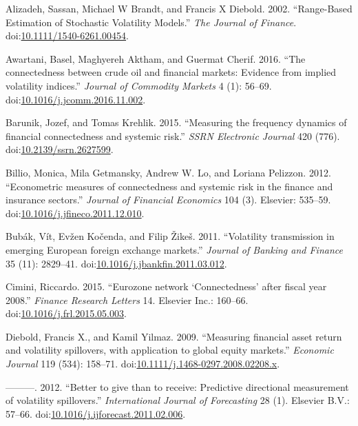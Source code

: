 \documentclass[]{elsarticle} %
\begin{document}
\hypertarget{refs}{}
\hypertarget{ref-Alizadeh2002}{}
Alizadeh, Sassan, Michael W Brandt, and Francis X Diebold. 2002.
``Range-Based Estimation of Stochastic Volatility Models.'' \emph{The
Journal of Finance}.
doi:\href{https://doi.org/10.1111/1540-6261.00454}{10.1111/1540-6261.00454}.

\hypertarget{ref-Awartani2016}{}
Awartani, Basel, Maghyereh Aktham, and Guermat Cherif. 2016. ``The
connectedness between crude oil and financial markets: Evidence from
implied volatility indices.'' \emph{Journal of Commodity Markets} 4 (1):
56--69.
doi:\href{https://doi.org/10.1016/j.jcomm.2016.11.002}{10.1016/j.jcomm.2016.11.002}.

\hypertarget{ref-Barunik2015}{}
Barunik, Jozef, and Tomas Krehlik. 2015. ``Measuring the frequency
dynamics of financial connectedness and systemic risk.'' \emph{SSRN
Electronic Journal} 420 (776).
doi:\href{https://doi.org/10.2139/ssrn.2627599}{10.2139/ssrn.2627599}.

\hypertarget{ref-Billio2012}{}
Billio, Monica, Mila Getmansky, Andrew W. Lo, and Loriana Pelizzon.
2012. ``Econometric measures of connectedness and systemic risk in the
finance and insurance sectors.'' \emph{Journal of Financial Economics}
104 (3). Elsevier: 535--59.
doi:\href{https://doi.org/10.1016/j.jfineco.2011.12.010}{10.1016/j.jfineco.2011.12.010}.

\hypertarget{ref-Bubak2011}{}
Bubák, Vít, Evžen Kočenda, and Filip Žikeš. 2011. ``Volatility
transmission in emerging European foreign exchange markets.''
\emph{Journal of Banking and Finance} 35 (11): 2829--41.
doi:\href{https://doi.org/10.1016/j.jbankfin.2011.03.012}{10.1016/j.jbankfin.2011.03.012}.

\hypertarget{ref-Cimini2015}{}
Cimini, Riccardo. 2015. ``Eurozone network `Connectedness' after fiscal
year 2008.'' \emph{Finance Research Letters} 14. Elsevier Inc.: 160--66.
doi:\href{https://doi.org/10.1016/j.frl.2015.05.003}{10.1016/j.frl.2015.05.003}.

\hypertarget{ref-Diebold2009}{}
Diebold, Francis X., and Kamil Yilmaz. 2009. ``Measuring financial asset
return and volatility spillovers, with application to global equity
markets.'' \emph{Economic Journal} 119 (534): 158--71.
doi:\href{https://doi.org/10.1111/j.1468-0297.2008.02208.x}{10.1111/j.1468-0297.2008.02208.x}.

\hypertarget{ref-Diebold2012}{}
---------. 2012. ``Better to give than to receive: Predictive
directional measurement of volatility spillovers.'' \emph{International
Journal of Forecasting} 28 (1). Elsevier B.V.: 57--66.
doi:\href{https://doi.org/10.1016/j.ijforecast.2011.02.006}{10.1016/j.ijforecast.2011.02.006}.
\end{document}
